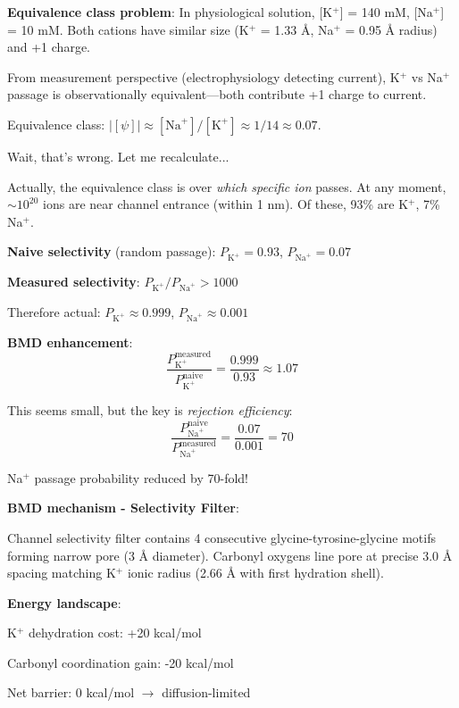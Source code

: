 \documentclass[11pt,onecolumn]{article}
\begin{document}
\textbf{Equivalence class problem}: In physiological solution, [K$^+$] = 140 mM, [Na$^+$] = 10 mM. Both cations have similar size (K$^+$ = 1.33 Å, Na$^+$ = 0.95 Å radius) and +1 charge.

From measurement perspective (electrophysiology detecting current), K$^+$ vs Na$^+$ passage is observationally equivalent---both contribute +1 charge to current.

Equivalence class: $|[\psi]| \approx [\text{Na}^+]/[\text{K}^+] \approx 1/14 \approx 0.07$.

Wait, that's wrong. Let me recalculate...

Actually, the equivalence class is over \textit{which specific ion} passes. At any moment, $\sim 10^{20}$ ions are near channel entrance (within 1 nm). Of these, 93\% are K$^+$, 7\% Na$^+$.

\textbf{Naive selectivity} (random passage): $P_{\text{K}^+} = 0.93$, $P_{\text{Na}^+} = 0.07$

\textbf{Measured selectivity}: $P_{\text{K}^+}/P_{\text{Na}^+} > 1000$

Therefore actual: $P_{\text{K}^+} \approx 0.999$, $P_{\text{Na}^+} \approx 0.001$

\textbf{BMD enhancement}:
\begin{equation}
\frac{P_{\text{K}^+}^{\text{measured}}}{P_{\text{K}^+}^{\text{naive}}} = \frac{0.999}{0.93} \approx 1.07
\end{equation}

This seems small, but the key is \textit{rejection efficiency}:
\begin{equation}
\frac{P_{\text{Na}^+}^{\text{naive}}}{P_{\text{Na}^+}^{\text{measured}}} = \frac{0.07}{0.001} = 70
\end{equation}

Na$^+$ passage probability reduced by 70-fold!

\textbf{BMD mechanism - Selectivity Filter}:

Channel selectivity filter contains 4 consecutive glycine-tyrosine-glycine motifs forming narrow pore (3 Å diameter). Carbonyl oxygens line pore at precise 3.0 Å spacing matching K$^+$ ionic radius (2.66 Å with first hydration shell).

\textbf{Energy landscape}:

K$^+$ dehydration cost: +20 kcal/mol

Carbonyl coordination gain: -20 kcal/mol

Net barrier: 0 kcal/mol $\to$ diffusion-limited
\end{document}
